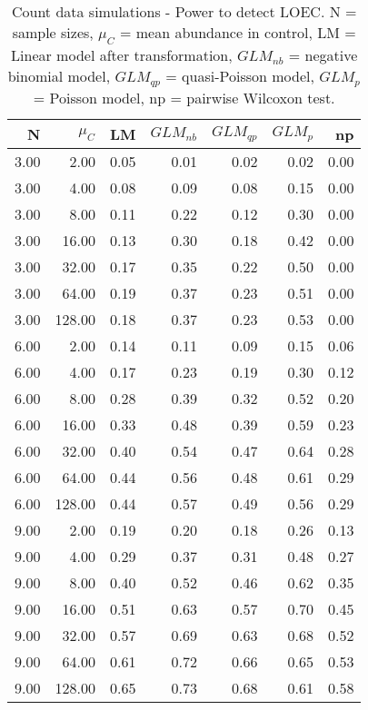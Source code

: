 \begin{table}[H]
\centering
\caption{Count data simulations - Power to detect LOEC. N = sample sizes, 
             $\mu_C$ = mean abundance in control, LM = Linear model after transformation, 
             $GLM_{nb}$ = negative binomial model, $GLM_{qp}$ = quasi-Poisson model, 
            $GLM_{p}$ = Poisson model, np = pairwise Wilcoxon test.} 
\label{tab:pow_loec_c}
{\footnotesize
\begin{tabular}{rrrrrrr}
  \hline
N & $\mu_C$ & LM & $GLM_{nb}$ & $GLM_{qp}$ & $GLM_{p}$ & np \\ 
  \hline
3.00 & 2.00 & 0.05 & 0.01 & 0.02 & 0.02 & 0.00 \\ 
  3.00 & 4.00 & 0.08 & 0.09 & 0.08 & 0.15 & 0.00 \\ 
  3.00 & 8.00 & 0.11 & 0.22 & 0.12 & 0.30 & 0.00 \\ 
  3.00 & 16.00 & 0.13 & 0.30 & 0.18 & 0.42 & 0.00 \\ 
  3.00 & 32.00 & 0.17 & 0.35 & 0.22 & 0.50 & 0.00 \\ 
  3.00 & 64.00 & 0.19 & 0.37 & 0.23 & 0.51 & 0.00 \\ 
  3.00 & 128.00 & 0.18 & 0.37 & 0.23 & 0.53 & 0.00 \\ 
  6.00 & 2.00 & 0.14 & 0.11 & 0.09 & 0.15 & 0.06 \\ 
  6.00 & 4.00 & 0.17 & 0.23 & 0.19 & 0.30 & 0.12 \\ 
  6.00 & 8.00 & 0.28 & 0.39 & 0.32 & 0.52 & 0.20 \\ 
  6.00 & 16.00 & 0.33 & 0.48 & 0.39 & 0.59 & 0.23 \\ 
  6.00 & 32.00 & 0.40 & 0.54 & 0.47 & 0.64 & 0.28 \\ 
  6.00 & 64.00 & 0.44 & 0.56 & 0.48 & 0.61 & 0.29 \\ 
  6.00 & 128.00 & 0.44 & 0.57 & 0.49 & 0.56 & 0.29 \\ 
  9.00 & 2.00 & 0.19 & 0.20 & 0.18 & 0.26 & 0.13 \\ 
  9.00 & 4.00 & 0.29 & 0.37 & 0.31 & 0.48 & 0.27 \\ 
  9.00 & 8.00 & 0.40 & 0.52 & 0.46 & 0.62 & 0.35 \\ 
  9.00 & 16.00 & 0.51 & 0.63 & 0.57 & 0.70 & 0.45 \\ 
  9.00 & 32.00 & 0.57 & 0.69 & 0.63 & 0.68 & 0.52 \\ 
  9.00 & 64.00 & 0.61 & 0.72 & 0.66 & 0.65 & 0.53 \\ 
  9.00 & 128.00 & 0.65 & 0.73 & 0.68 & 0.61 & 0.58 \\ 
   \hline
\end{tabular}
}
\end{table}
